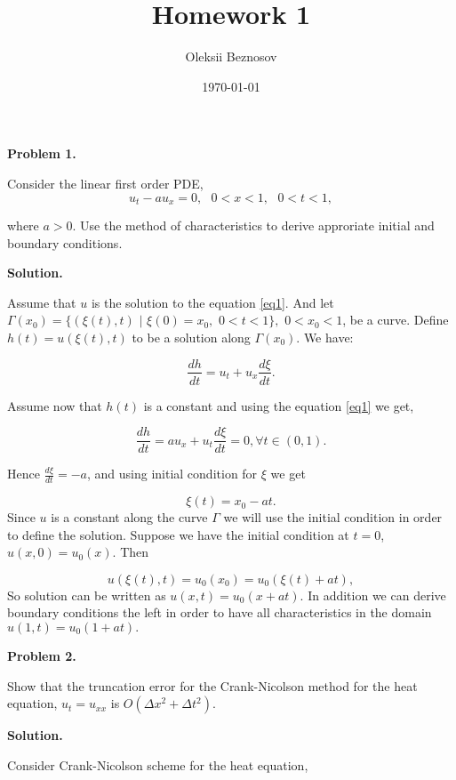\documentclass{article}
\title{Homework 1}
\author{Oleksii Beznosov}
\date{\today}
\begin{document}
\maketitle
\begin{flushleft}

\textbf {Problem 1.}
\par Consider the linear first order PDE,
\begin{equation}\label{eq1}
u_t - a u_x = 0,\,\,\,\,0 < x < 1,\,\,\,\, 0 < t < 1,
\end{equation}
\par where $a > 0$. Use the method of characteristics to derive 
approriate initial and boundary conditions.
\par
\textbf {Solution.}
\par
Assume that $u$ is the solution to the equation \eqref{eq1}. And let
$\Gamma (x_0) = \{(\xi(t), t)\,\, | \,\,\xi(0) = x_0,\,\, 0 < t < 1\},\,\, 0 < x_0 < 1$,
be a curve. Define $h(t) = u(\xi(t), t)$ to be a
solution along $\Gamma(x_0)$. We have:

\begin{equation}\label{eq2}
\frac{dh}{dt} = u_t + u_x \frac{d\xi}{dt}.  
\end{equation}

Assume now that $h(t)$ is a constant and using the equation \eqref{eq1}
we get,

\begin{equation}\label{eq3}
\frac{dh}{dt} = a u_x + u_t \frac{d\xi}{dt} = 0, \forall t \in (0,1).
\end{equation}

Hence $\frac{d\xi}{dt} = -a$, and using initial condition for $\xi$ we
get 

\begin{equation}\label{eq4}
\xi(t) = x_0-at.
\end{equation}
Since $u$ is a constant along the curve $\Gamma$ we will use the initial
condition in order to define the solution. Suppose we have the initial 
condition at $t=0$, $u(x,0) = u_0(x)$. Then 

\[u(\xi(t),t) = u_0(x_0) = u_0(\xi(t) + at),\]
So solution can be written as $u(x,t) = u_0(x + at)$. In addition we
can derive boundary conditions the left in order to have all characteristics in the domain  
$u(1,t)  = u_0(1 + at).$ 
\newpage
\par \textbf {Problem 2.}
\par Show that the truncation error for the Crank-Nicolson method for the
heat equation, $u_t = u_{xx}$ is $O(\Delta x^2 + \Delta t^2)$.
\par \textbf {Solution.}
\par 
Consider Crank-Nicolson scheme for the heat equation,


\end{flushleft}
\end{document}
